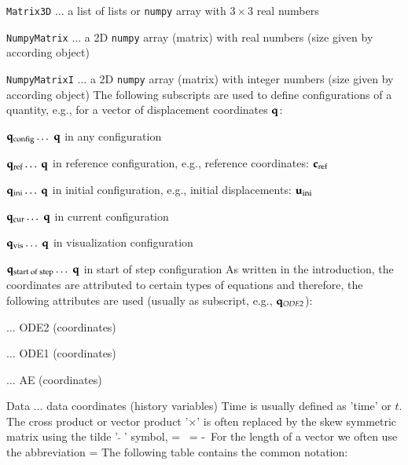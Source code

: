 	\item \texttt{Matrix3D} $\ldots$ a list of lists or \texttt{numpy} array with $3 \times 3$ real numbers
	\item \texttt{NumpyMatrix} $\ldots$ a 2D \texttt{numpy} array (matrix) with real numbers (size given by according object)
	\item \texttt{NumpyMatrixI} $\ldots$ a 2D \texttt{numpy} array (matrix) with integer numbers (size given by according object)
\ei
%
The following subscripts are used to define configurations of a quantity, e.g., for a vector of displacement coordinates $\mathbf{q}$:
\bi
  \item $\mathbf{q}_\mathrm{config} \ldots$ $\mathbf{q}$ in any configuration
  \item $\mathbf{q}_\mathrm{ref} \ldots$ $\mathbf{q}$ in reference configuration, e.g., reference coordinates: $\mathbf{c}_\mathrm{ref}$
  \item $\mathbf{q}_\mathrm{ini} \ldots$ $\mathbf{q}$ in initial configuration, e.g., initial displacements: $\mathbf{u}_\mathrm{ini}$
  \item $\mathbf{q}_\mathrm{cur} \ldots$ $\mathbf{q}$ in current configuration
  \item $\mathbf{q}_\mathrm{vis} \ldots$ $\mathbf{q}$ in visualization configuration
  \item $\mathbf{q}_\mathrm{start\;of\;step} \ldots$ $\mathbf{q}$ in start of step configuration
\ei
As written in the introduction, the coordinates are attributed to certain types of equations and therefore, the following attributes are used (usually as subscript, e.g., $\mathbf{q}_{ODE2}$):
\bi
  \item {} $\ldots$ \acl{ODE2} (coordinates)
  \item {} $\ldots$ \acl{ODE1} (coordinates)
  \item {} $\ldots$ \acl{AE} (coordinates)
  \item Data $\ldots$ data coordinates (history variables)
\ei
Time is usually defined as 'time' or $t$.
The cross product or vector product '$\times$' is often replaced by the skew symmetric matrix using the tilde '$\tilde{\;\;}$' symbol,
\be
  \av \times \bv = \tilde \av \, \bv = -\tilde \bv \, \av \eqDot
\ee
For the length of a vector we often use the abbreviation 
\be \label{eq:definition:length}
  \Vert \av \Vert =  \eqDot
\ee
%
\label{sec:symbolsItems}
\noindent The following table contains the common notation: \vspace{-12pt}
